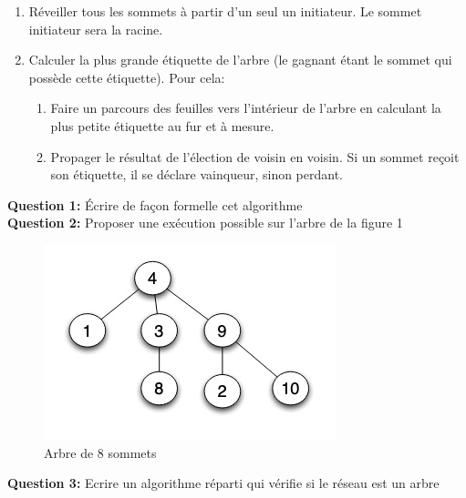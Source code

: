 \documentclass{article}[12pt]
\begin{document}
\begin{enumerate}
    \item Réveiller tous les sommets à partir d’un seul un initiateur. Le sommet initiateur sera la
racine.

\item Calculer la plus grande étiquette de l’arbre (le gagnant étant le sommet qui possède cette
étiquette). Pour cela:

\begin{enumerate}
    \item Faire un parcours des feuilles vers l’intérieur de l’arbre en calculant la plus petite
étiquette au fur et à mesure.
\item Propager le résultat de l’élection de voisin en voisin. Si un sommet reçoit son étiquette,
il se déclare vainqueur, sinon perdant.


\end{enumerate}
\end{enumerate}

\textbf{Question 1:}
Écrire de façon formelle cet algorithme\\

\textbf{Question 2:} Proposer une exécution possible sur l'arbre de la figure 1\\

\begin{figure}[h!]
    \centering
    \includegraphics[scale=0.8]{a3.jpg}
    \caption{Arbre de 8 sommets}
    \label{fig:my_label}
\end{figure}

\textbf{Question 3:} Ecrire un algorithme réparti qui vérifie si le réseau est un arbre
\end{document}
